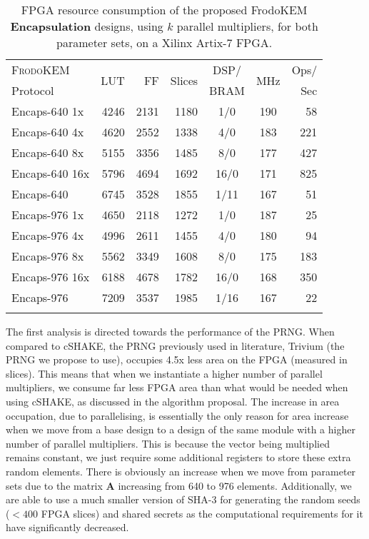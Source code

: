 \begin{table}[!t]
\centering
\caption{FPGA resource consumption of the proposed FrodoKEM \textbf{Encapsulation} designs, using $k$ parallel multipliers, for both parameter sets, on a Xilinx Artix-7 FPGA.}\label{tab:encapsresults}
\begin{tabular}{l r r r c c r}
\hline \Tstrut
  \textsc{FrodoKEM} & \multirow{2}{*}{LUT} & \multirow{2}{*}{FF} & \multirow{2}{*}{Slices} & DSP/ & \multirow{2}{*}{MHz} & Ops/ \\
Protocol &&&& BRAM && Sec  \\ \hline \Tstrut

Encaps-640 1x & 4246 & 2131 & 1180 & 1/0 & 190 & 58 \\
Encaps-640 4x & 4620 & 2552 & 1338 & 4/0 & 183 & 221 \\
Encaps-640 8x & 5155 & 3356 & 1485 & 8/0 & 177 & 427 \\
Encaps-640 16x & 5796 & 4694 & 1692 & 16/0 & 171 & 825 \\ \hline \Tstrut
Encaps-640 \cite{howe2018standard} & 6745 & 3528 & 1855 & 1/11 & 167 & 51 \\ \hline \Tstrut


Encaps-976 1x & 4650 & 2118 & 1272 & 1/0 & 187 & 25 \\
Encaps-976 4x & 4996 & 2611 & 1455 & 4/0 & 180 & 94 \\
Encaps-976 8x & 5562 & 3349 & 1608 & 8/0 & 175 & 183 \\
Encaps-976 16x & 6188 & 4678 & 1782 & 16/0 & 168 & 350 \\ \hline \Tstrut

Encaps-976 \cite{howe2018standard} & 7209 & 3537 & 1985 & 1/16 & 167 & 22 \\ \hline \Tstrut


\end{tabular}%
\end{table}


The first analysis is directed towards the performance of the PRNG. When compared to cSHAKE, the PRNG previously used in literature, Trivium (the PRNG we propose to use), occupies 4.5x less area on the FPGA (measured in slices). This means that when we instantiate a higher number of parallel multipliers, we consume far less FPGA area than what would be needed when using cSHAKE, as discussed in the algorithm proposal. The increase in area occupation, due to parallelising, is essentially the only reason for area increase when we move from a base design to a design of the same module with a higher number of parallel multipliers. This is because the vector being multiplied remains constant, we just require some additional registers to store these extra random elements. There is obviously an increase when we move from parameter sets due to the matrix $\mathbf{A}$ increasing from 640 to 976 elements. Additionally, we are able to use a much smaller version of SHA-3 for generating the random seeds ($<400$ FPGA slices) and shared secrets as the computational requirements for it have significantly decreased.

